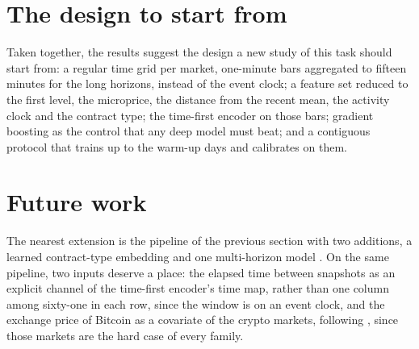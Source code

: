 \section{The design to start from}
\label{sec:concl:today}

Taken together, the results suggest the design a new study of this task should start from:
a regular time grid per market, one-minute bars aggregated to fifteen minutes for the long
horizons, instead of the event clock; a feature set reduced to the first level, the
microprice, the distance from the recent mean, the activity clock and the contract type; the
time-first encoder on those bars; gradient boosting as the control that any deep model must
beat; and a contiguous protocol that trains up to the warm-up days and calibrates on them.

\section{Future work}
\label{sec:concl:future}

The nearest extension is the pipeline of the previous section with two additions, a
learned contract-type embedding and one multi-horizon model \cite{zhang2021multihorizon}.
On the same pipeline, two inputs deserve a place: the elapsed time between snapshots as an
explicit channel of the time-first encoder's time map, rather than one column among
sixty-one in each row, since the window is on an event clock, and the
exchange price of Bitcoin as a covariate of the crypto markets, following
\textcite{young2026openmarket}, since those markets are the hard case of every family.

